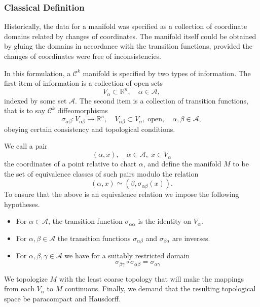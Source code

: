 \documentclass[12pt]{article}
\newcommand{\reals}{\mathbb{R}}
\newcommand{\cA}{\mathcal{A}}
\newcommand{\cC}{\mathcal{C}}
\begin{document}

\subsubsection*{Classical Definition} 
Historically, the data for a
 manifold was specified as a collection of coordinate domains related
 by changes of coordinates. The manifold itself could be obtained by
 gluing the domains in accordance with the transition functions,
 provided the changes of coordinates were free of inconsistencies.
 
 In this formulation, a $\cC^k$ manifold is specified by two types of
 information. The first item of information is a collection of open
 sets
 $$V_\alpha\subset\reals^n,\quad \alpha\in \cA,$$
 indexed by some set
 $\cA$. The second item is a collection of transition functions, that
 is to say $\cC^k$ diffeomorphisms
 $$\sigma_{\alpha\beta}:V_{\alpha\beta}\rightarrow \reals^n,\quad
 V_{\alpha\beta}\subset
 V_\alpha,\;\text{open},\quad\alpha,\beta\in\cA,$$
 obeying certain
 consistency and topological conditions.
 
 
 We call a pair
 $$(\alpha,x),\quad \alpha\in \cA,\; x\in V_\alpha$$
 the coordinates of
 a point relative to chart $\alpha$, and define the manifold $M$
 to be the set of equivalence classes of such pairs modulo the relation
 $$(\alpha,x)\simeq (\beta,\sigma_{\alpha\beta}(x)).$$
 To ensure that the above is an
 equivalence relation we impose the following hypotheses.
 \begin{itemize}
 \item For $\alpha\in \cA$, the transition function
 $\sigma_{\alpha\alpha}$ is the identity on $V_\alpha$.
 \item For $\alpha,\beta\in \cA$ the transition functions
 $\sigma_{\alpha\beta}$ and $\sigma_{\beta\alpha}$ are inverses.
 \item For $\alpha,\beta,\gamma\in \cA$ we have for a suitably
 restricted domain
 $$\sigma_{\beta\gamma}\circ\sigma_{\alpha\beta} =
 \sigma_{\alpha\gamma}$$
 \end{itemize}
 We topologize $M$ with the least coarse topology that will make
 the
 mappings from each $V_\alpha$ to $M$ continuous. Finally, we
 demand
 that the resulting topological space be paracompact and Hausdorff.
 
\end{document}
